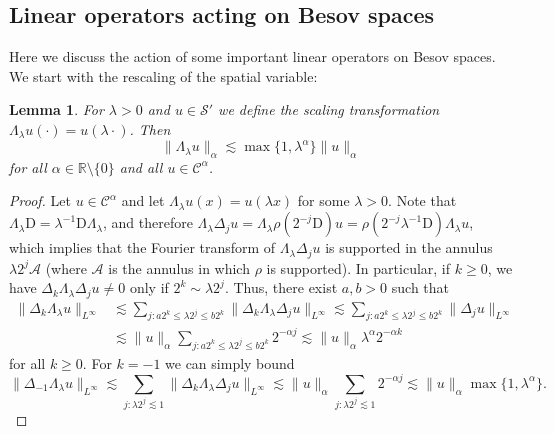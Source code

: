 \documentclass[a4paper,11pt]{article}
\newcommand{\mathD}{\mathrm{D}}
\newtheorem{lemma}[theorem]{Lemma}
\theoremstyle{remark}
\newcommand{\CA}{\ensuremath{\mathscr{A}}}
\newcommand{\CC}{\ensuremath{\mathscr{C}}}
\newcommand{\CS}{\ensuremath{\mathscr{S}}}
\begin{document}
\subsection{Linear operators acting on Besov spaces}

Here we discuss the action of some important linear operators on Besov spaces. We start with the rescaling of the spatial variable:

\begin{lemma}\label{lemma:scaling}
  For $\lambda >0$ and $u \in \CS'$ we define the scaling transformation $\Lambda_{\lambda} u ( \cdot ) =u ( \lambda \cdot )$. Then
  \[
     \| \Lambda_{\lambda} u \|_{\alpha} \lesssim \max\{1, \lambda^{\alpha} \} \| u \|_{\alpha}
  \]
  for all $\alpha \in \mathbb{R} \setminus \{ 0 \}$ and all $u \in \CC^{\alpha}$.
\end{lemma}

\begin{proof}
  Let $u \in \CC^{\alpha}$ and let $\Lambda_{\lambda} u ( x ) =u ( \lambda x )$ for some $\lambda >0$. Note that $\Lambda_{\lambda} \mathD =  \lambda^{-1} \mathD \Lambda_{\lambda}$, and therefore $\Lambda_{\lambda} \Delta_{j} u= \Lambda_{\lambda} \rho ( 2^{-j} \mathD ) u= \rho ( 2^{-j} \lambda^{-1} \mathD ) \Lambda_{\lambda} u$, which implies that the Fourier transform of $\Lambda_{\lambda} \Delta_{j} u$ is supported in the annulus $\lambda 2^{j} \CA$ (where $\CA$ is the annulus in which $\rho$ is supported). In particular, if $k \geqslant 0$, we have $\Delta_{k} \Lambda_{\lambda} \Delta_{j} u \neq 0$ only if $2^{k} \sim \lambda 2^{j}$. Thus, there exist $a,b>0$ such that
  \begin{align*}
     \| \Delta_{k} \Lambda_{\lambda} u \|_{L^{\infty}} & \lesssim \sum_{j:a2^{k} \leqslant \lambda 2^{j} \leqslant b2^{k}} \| \Delta_{k} \Lambda_{\lambda} \Delta_{j} u \|_{L^{\infty}} \lesssim \sum_{j:a2^{k} \leqslant \lambda 2^{j} \leqslant b2^{k}} \| \Delta_{j} u \|_{L^{\infty}} \\
     & \lesssim \| u \|_{\alpha} \sum_{j:a2^{k} \leqslant \lambda 2^{j} \leqslant b2^{k}} 2^{- \alpha j} \lesssim \| u \|_{\alpha} \lambda^{\alpha} 2^{- \alpha k} 
  \end{align*}
  for all $k \geqslant 0$. For $k=-1$ we can simply bound
  \[
     \| \Delta_{-1} \Lambda_{\lambda} u \|_{L^{\infty}} \lesssim \sum_{j: \lambda 2^{j} \lesssim 1} \| \Delta_{k} \Lambda_{\lambda} \Delta_{j} u \|_{L^{\infty}} \lesssim \| u \|_{\alpha} \sum_{j: \lambda 2^{j} \lesssim 1} 2^{- \alpha j} \lesssim \| u \|_{\alpha} \max\{1, \lambda^{\alpha} \}.
  \]
\end{proof}
\end{document}

